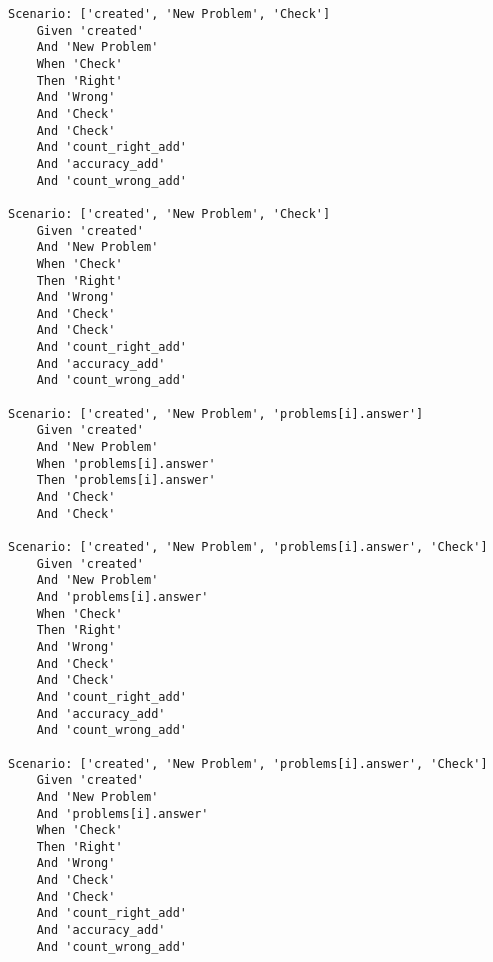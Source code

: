 \begin{lstlisting}
Scenario: ['created', 'New Problem', 'Check']
	Given 'created'
	And 'New Problem'
	When 'Check'
	Then 'Right'
	And 'Wrong'
	And 'Check'
	And 'Check'
	And 'count_right_add'
	And 'accuracy_add'
	And 'count_wrong_add'

Scenario: ['created', 'New Problem', 'Check']
	Given 'created'
	And 'New Problem'
	When 'Check'
	Then 'Right'
	And 'Wrong'
	And 'Check'
	And 'Check'
	And 'count_right_add'
	And 'accuracy_add'
	And 'count_wrong_add'

Scenario: ['created', 'New Problem', 'problems[i].answer']
	Given 'created'
	And 'New Problem'
	When 'problems[i].answer'
	Then 'problems[i].answer'
	And 'Check'
	And 'Check'

Scenario: ['created', 'New Problem', 'problems[i].answer', 'Check']
	Given 'created'
	And 'New Problem'
	And 'problems[i].answer'
	When 'Check'
	Then 'Right'
	And 'Wrong'
	And 'Check'
	And 'Check'
	And 'count_right_add'
	And 'accuracy_add'
	And 'count_wrong_add'

Scenario: ['created', 'New Problem', 'problems[i].answer', 'Check']
	Given 'created'
	And 'New Problem'
	And 'problems[i].answer'
	When 'Check'
	Then 'Right'
	And 'Wrong'
	And 'Check'
	And 'Check'
	And 'count_right_add'
	And 'accuracy_add'
	And 'count_wrong_add'

\end{lstlisting}